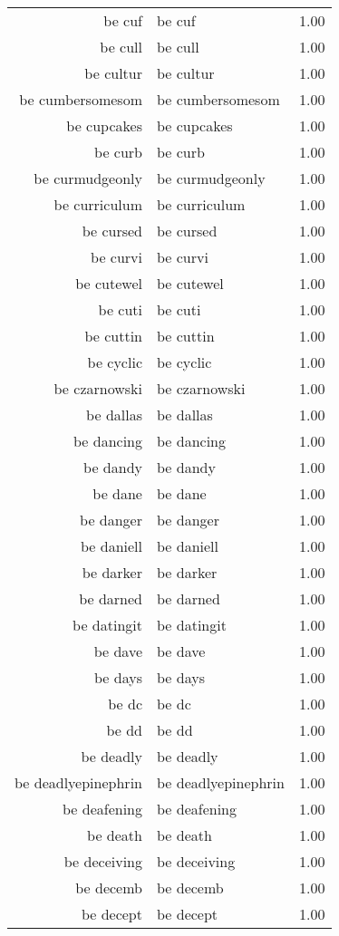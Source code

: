 \begin{table}[ht]
\begin{tabular}{rlr}
  be cuf & be cuf & 1.00 \\ 
  be cull & be cull & 1.00 \\ 
  be cultur & be cultur & 1.00 \\ 
  be cumbersomesom & be cumbersomesom & 1.00 \\ 
  be cupcakes & be cupcakes & 1.00 \\ 
  be curb & be curb & 1.00 \\ 
  be curmudgeonly & be curmudgeonly & 1.00 \\ 
  be curriculum & be curriculum & 1.00 \\ 
  be cursed & be cursed & 1.00 \\ 
  be curvi & be curvi & 1.00 \\ 
  be cutewel & be cutewel & 1.00 \\ 
  be cuti & be cuti & 1.00 \\ 
  be cuttin & be cuttin & 1.00 \\ 
  be cyclic & be cyclic & 1.00 \\ 
  be czarnowski & be czarnowski & 1.00 \\ 
  be dallas & be dallas & 1.00 \\ 
  be dancing & be dancing & 1.00 \\ 
  be dandy & be dandy & 1.00 \\ 
  be dane & be dane & 1.00 \\ 
  be danger & be danger & 1.00 \\ 
  be daniell & be daniell & 1.00 \\ 
  be darker & be darker & 1.00 \\ 
  be darned & be darned & 1.00 \\ 
  be datingit & be datingit & 1.00 \\ 
  be dave & be dave & 1.00 \\ 
  be days & be days & 1.00 \\ 
  be dc & be dc & 1.00 \\ 
  be dd & be dd & 1.00 \\ 
  be deadly & be deadly & 1.00 \\ 
  be deadlyepinephrin & be deadlyepinephrin & 1.00 \\ 
  be deafening & be deafening & 1.00 \\ 
  be death & be death & 1.00 \\ 
  be deceiving & be deceiving & 1.00 \\ 
  be decemb & be decemb & 1.00 \\ 
  be decept & be decept & 1.00 \\ 

\end{tabular}
\end{table}
